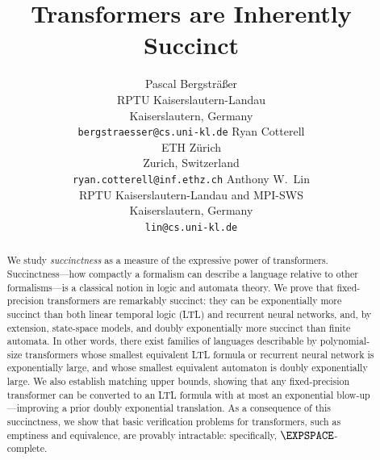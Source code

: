 \documentclass{article} %
\title{Transformers are Inherently Succinct}
\author{Pascal Bergsträßer \\
	RPTU Kaiserslautern-Landau\\
	Kaiserslautern, Germany \\
	\texttt{bergstraesser@cs.uni-kl.de}
	\And
	Ryan Cotterell \\
	ETH Zürich \\
	Zurich, Switzerland \\
	\texttt{ryan.cotterell@inf.ethz.ch}
	\And
	Anthony W.\ Lin \\
	RPTU Kaiserslautern-Landau and MPI-SWS\\
	Kaiserslautern, Germany \\
	\texttt{lin@cs.uni-kl.de} \\
}
\newcommand{\OMIT}[1]{}
\begin{document}
\maketitle

\begin{abstract}
We study \emph{succinctness} as a measure of the expressive power of
transformers.
Succinctness---how compactly a formalism can describe a
language relative to other formalisms---is a classical notion in logic and
automata theory.
We
prove that fixed-precision transformers are remarkably succinct: they can
be exponentially more succinct than both linear temporal logic (LTL) and recurrent neural networks, and, by extension, state-space
models, and doubly exponentially more succinct than finite automata.
In other words, there exist families of languages describable by polynomial-size
transformers whose smallest equivalent LTL formula or recurrent neural network is exponentially
large, and whose smallest equivalent automaton is doubly exponentially
large. We also establish matching upper bounds, showing that any
fixed-precision transformer can be converted to an LTL formula with at
most an exponential blow-up---improving a prior doubly exponential
translation. As a consequence of this succinctness, we show that basic
verification problems for transformers, such as emptiness and equivalence,
are provably intractable: specifically, $\EXPSPACE$-complete.
%

    \OMIT{
    Recent years saw a surprising result that transformers with fixed
    precision recognize at most star-free regular languages.
    Star-free regular languages admit various standard representations
    including Linear Temporal Logic (LTL) formulas, as well as counter-free
    finite-state automata.
    In this paper, we provides evidence of the
    we show in this paper that
    transformers with fixed precision are inherently succinct compared to
    standard representations.
    More precisely, they
    can represent star-free regular languages exponentially (resp. doubly
    exponentially) more compactly than LTL formulas (resp. finite automata).
    }
\end{abstract}
\end{document}
